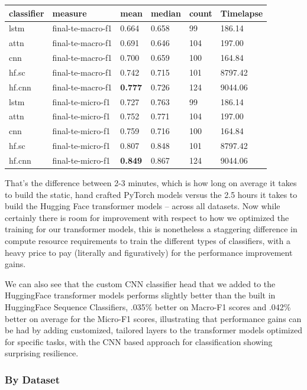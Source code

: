 \documentclass[final]{clv2025}
\begin{document}
\begin{table}[h!]
\label{tab}
\begin{tabular}{llllll}
\toprule
\textbf{classifier} &	\textbf{measure} &	\textbf{mean} &	\textbf{median} &	\textbf{count} &	\textbf{Timelapse}\\
\midrule
lstm&	final-te-macro-f1&	0.664&	0.658&	99&	186.14\\
attn&	final-te-macro-f1&	0.691&	0.646&	104&	197.00\\
cnn&	final-te-macro-f1&	0.700&	0.659&	100&	164.84\\
hf.sc&	final-te-macro-f1&	0.742&	0.715&	101	&8797.42\\
hf.cnn&	final-te-macro-f1&	\textbf{0.777}&	0.726&	124	&9044.06\\
lstm	&final-te-micro-f1&	0.727&	0.763&	99	&186.14\\
attn&	final-te-micro-f1&	0.752&	0.771&	104	&197.00\\
cnn	&final-te-micro-f1&	0.759	&0.716	&100	&164.84\\
hf.sc&	final-te-micro-f1&	0.807&	0.848&	101	&8797.42\\
hf.cnn&	final-te-micro-f1&	\textbf{0.849}&	0.867&	124	&9044.06\\


\bottomrule
\end{tabular}
\end{table}
That’s the difference between 2-3 minutes, which is how long on average it takes to build the static, hand crafted PyTorch models versus the 2.5 hours it takes to build the Hugging Face transformer models – across all datasets. Now while certainly there is room for improvement with respect to how we optimized the training for our transformer models, this is nonetheless a staggering difference in compute resource requirements to train the different types of classifiers, with a heavy price to pay (literally and figuratively) for the performance improvement gains.

We can also see that the custom CNN classifier head that we added to the HuggingFace transformer models performs slightly better than the built in HuggingFace Sequence Classifiers, .035\% better on Macro-F1 scores and .042\% better on average for the Micro-F1 scores, illustrating that performance gains can be had by adding customized, tailored layers to the transformer models optimized for specific tasks, with the CNN based approach for classification showing surprising resilience.

\subsubsection{By Dataset}
\end{document}
